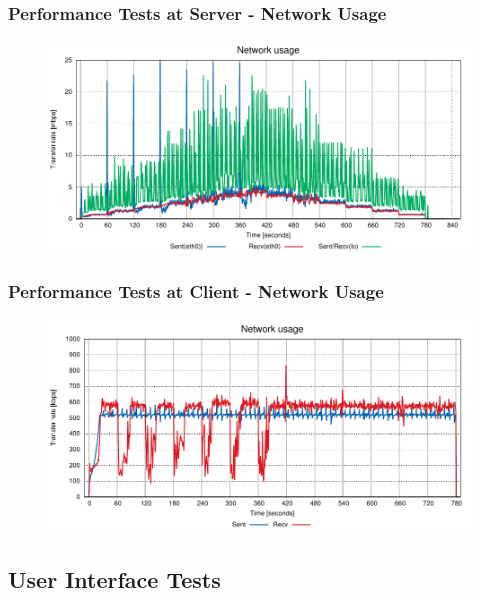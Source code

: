 \documentclass[compress]{beamer}
\begin{document}
	\begin{frame}[c]
		\frametitle{Performance Tests at Server - Network Usage}
		\begin{figure}[H]
			\includegraphics[width=\textwidth]{figures/net.pdf}
		\end{figure}
	\end{frame}

	\begin{frame}[c]
		\frametitle{Performance Tests at Client - Network Usage}
		\begin{figure}[H]
			\includegraphics[width=\textwidth]{figures/net_clt.pdf}
		\end{figure}
	\end{frame}

\subsection{User Interface Tests}
\end{document}
